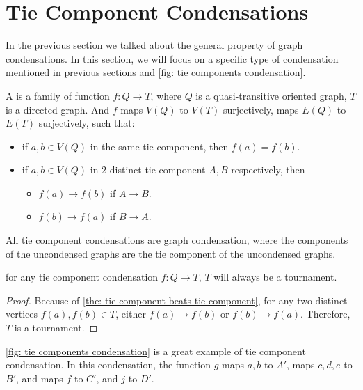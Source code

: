 \section{Tie Component Condensations}

In the previous section we talked about the general property
of graph condensations.
In this section, we will focus on a specific type of condensation
mentioned in previous sections and
\cref{fig: tie components condensation}.

\begin{definition}
  A  is a
  family of function \(f: Q \to T\),
  where \(Q\) is a quasi-transitive oriented graph,
  \(T\) is a directed graph.
  And \(f\) maps \(V(Q)\) to \(V(T)\) surjectively,
  maps \(E(Q)\) to \(E(T)\) surjectively,
  such that:
  \begin{itemize}
    \item if \(a, b \in V(Q)\) in the same tie component,
      then \(f(a) = f(b)\).
    \item if \(a, b \in V(Q)\) in 2 distinct tie component
      \(A, B\) respectively,
      then
      \begin{itemize}
        \item \(f(a) \to f(b)\) if \(A \to B\).
        \item \(f(b) \to f(a)\) if \(B \to A\).
      \end{itemize}
  \end{itemize}
\end{definition}

\begin{corollary}\label{the: tie condensation are condensation}
  All tie component condensations are graph condensation,
  where the components of the uncondensed graphs
  are the tie component of the uncondensed graphs.
\end{corollary}

\begin{corollary}\label{the: tie condensation results in tournament}
  for any tie component condensation \(f: Q \to T\),
  \(T\) will always be a tournament.
\end{corollary}
\begin{proof}
  Because of \cref{the: tie component beats tie component},
  for any two distinct vertices \(f(a), f(b) \in T\),
  either \(f(a) \to f(b)\) or \(f(b) \to f(a)\).
  Therefore, \(T\) is a tournament.
\end{proof}

\cref{fig: tie components condensation} is a great example of
tie component condensation.
In this condensation, the function \(g\) maps \(a, b\) to \(A'\),
maps \(c, d, e\) to \(B'\), and maps \(f\) to \(C'\),
and \(j\) to \(D'\).

